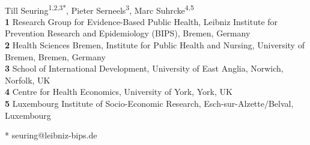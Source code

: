 \documentclass[10pt,letterpaper]{article}
\begin{document}
\vspace*{0.2in}

\begin{flushleft}
{\Large
\textbf{} %
}
\newline
\\
Till Seuring\textsuperscript{1,2,3*},
Pieter Serneels\textsuperscript{3},
Marc Suhrcke\textsuperscript{4,5} \\
\bigskip
\textbf{1} Research Group for Evidence-Based Public Health, Leibniz Institute for Prevention Research and Epidemiology (BIPS), Bremen, Germany
\\
\textbf{2} Health Sciences Bremen, Institute for Public Health and Nursing, University of Bremen, Bremen, Germany
\\
\textbf{3} School of International Development, University of East Anglia, Norwich, Norfolk, UK
\\
\textbf{4} Centre for Health Economics, University of York, York, UK
\\
\textbf{5} Luxembourg Institute of Socio-Economic Research, Esch-sur-Alzette/Belval, Luxembourg
\bigskip

% 
%



* seuring@leibniz-bips.de

\end{flushleft}
\end{document}
